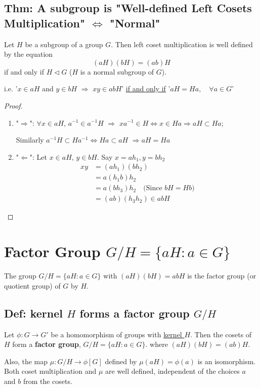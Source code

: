 \documentclass[11pt]{elegantbook}
\begin{document}
\subsection{Thm: A subgroup is "Well-defined Left Cosets Multiplication" $\Leftrightarrow$ "Normal"}
\begin{theorem}
    Let $H$ be a subgroup of a group $G$. Then left coset multiplication is well defined by the equation
    $$(aH)(bH) = (ab)H$$
    if and only if $H \lhd G$ ($H$ is a normal subgroup of $G$).

    i.e. '$x\in aH$ and $y\in bH$ $\Rightarrow$ $xy\in abH$' \underline{if and only if} '$aH=Ha,\quad \forall a\in G$'
\end{theorem}
\begin{proof}
    \quad

\begin{enumerate}[$\bullet$]
    \item "$\Rightarrow$": $\forall x\in aH$, $a^{-1}\in a^{-1}H$ $\Rightarrow$ $xa^{-1}\in H \Leftrightarrow x\in Ha \Rightarrow aH\subset Ha$;
    
    \quad Similarly $a^{-1}H\subset Ha^{-1} \Leftrightarrow	Ha\subset aH$ $\Rightarrow	aH=Ha$
    \item "$\Leftarrow$": Let $x\in aH$, $y\in bH$. Say $x=ah_1, y=bh_2$
    \begin{equation}
        \begin{aligned}
            xy&=(ah_1)(bh_2)\\
            &=a(h_1 b)h_2\\
            &=a(b h_3)h_2 \quad \text{(Since $bH=Hb$)}\\
            &=(ab)(h_3 h_2)\in abH
        \end{aligned}
        \nonumber
    \end{equation}
\end{enumerate}
\end{proof}


\section{Factor Group $G/H=\{aH:a\in G\}$}
\begin{definition}
    The group $G/H=\{aH:a\in G\}$ with $(aH)(bH)=abH$ is the factor group (or quotient group) of
    $G$ by $H$.
\end{definition}
\subsection{Def: kernel $H$ forms a factor group $G/H$}
\begin{definition}
    Let $\phi: G \rightarrow G'$ be a homomorphism of groups with \underline{kernel $H$}. Then the cosets of $H$ form
    a \textbf{factor group}, $G/H=\{aH:a\in G\}$. where $(aH)(bH) = (ab)H$.
\end{definition}
Also, the map $\mu: G/H \rightarrow \phi[G]$
    defined by $\mu(aH) = \phi(a)$ is an isomorphism. Both coset multiplication and $\mu$ are well
    defined, independent of the choices $a$ and $b$ from the cosets.
\end{document}
